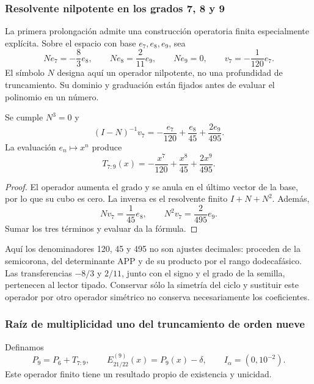 \subsubsection{Resolvente nilpotente en los grados 7, 8 y 9}
\label{subsec:alpha-resolvente}

La primera prolongación admite una construcción operatoria finita
especialmente explícita. Sobre el espacio con base \(e_7,e_8,e_9\),
sea
\[
 Ne_7=-\frac83e_8,\qquad Ne_8=\frac2{11}e_9,\qquad Ne_9=0,
 \qquad v_7=-\frac1{120}e_7.
\]
El símbolo \(N\) designa aquí un operador nilpotente, no una profundidad
de truncamiento. Su dominio y graduación están fijados antes de evaluar
el polinomio en un número.

\begin{lemma}
\label{lem:alpha-resolvente}
Se cumple \(N^3=0\) y
\[
 (I-N)^{-1}v_7
 =-\frac{e_7}{120}+\frac{e_8}{45}+\frac{2e_9}{495}.
\]
La evaluación \(e_n\mapsto x^n\) produce
\begin{equation}
 T_{7:9}(x)=-\frac{x^7}{120}+\frac{x^8}{45}+\frac{2x^9}{495}.
 \label{eq:alpha-t79}
\end{equation}
\end{lemma}

\begin{proof}
El operador aumenta el grado y se anula en el último vector de la base,
por lo que su cubo es cero. La inversa es el resolvente finito
\(I+N+N^2\). Además,
\[
 Nv_7=\frac1{45}e_8,\qquad N^2v_7=\frac2{495}e_9.
\]
Sumar los tres términos y evaluar da la fórmula.
\end{proof}

Aquí los denominadores 120, 45 y 495 no son ajustes decimales: proceden
de la semicorona, del determinante APP y de su producto por el rango
dodecafásico. Las transferencias \(-8/3\) y \(2/11\), junto con el
signo y el grado de la semilla, pertenecen al lector tipado. Conservar
sólo la simetría del ciclo y sustituir este operador por otro operador
simétrico no conserva necesariamente los coeficientes.

\subsubsection{Raíz de multiplicidad uno del truncamiento de orden nueve}
\label{subsec:alpha-jet}

Definamos
\[
 P_9=P_6+T_{7:9},\qquad E_{21/22}^{(9)}(x)=P_9(x)-\delta,
 \qquad I_\alpha=(0,10^{-2}).
\]
Este operador finito tiene un resultado propio de existencia y unicidad.

